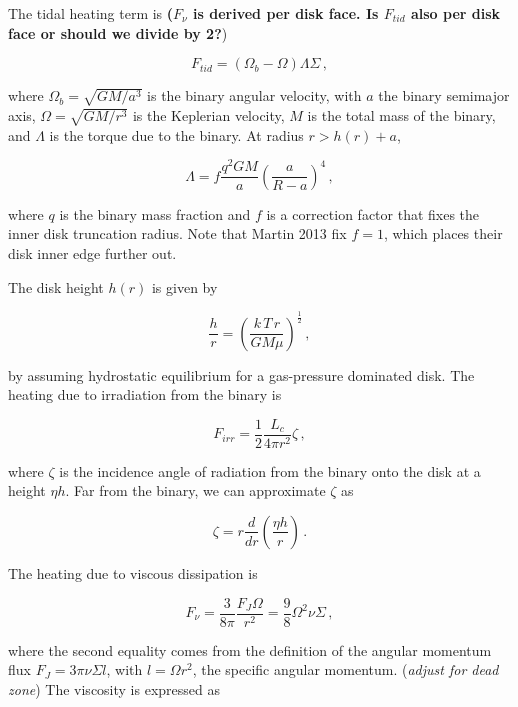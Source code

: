 \documentclass{article}
\begin{document}
The tidal heating term is \textbf{($F_{\nu}$ is derived per disk face. Is $F_{tid}$ also per disk face or should we divide by 2?})

\begin{equation}
F_{tid} = \left(\Omega_b - \Omega\right) \Lambda \Sigma\,,
\end{equation}

where $\Omega_b = \sqrt{G M/a^3}$ is the binary angular velocity, with $a$ the binary semimajor axis, $\Omega = \sqrt{G M/r^{3}}$ is the Keplerian velocity, $M$ is the total mass of the binary, and $\Lambda$ is the torque due to the binary. At radius $r > h(r) + a$,

\begin{equation}
\Lambda = f \frac{q^2 GM}{a} \left(\frac{a}{R-a}\right)^4\,,
\end{equation}

where $q$ is the binary mass fraction and $f$ is a correction factor that fixes the inner disk truncation radius. Note that Martin 2013 fix $f =1$, which places their disk inner edge further out. 

The disk height $h(r)$ is given by

\begin{equation}
\frac{h}{r} = \left(\frac{k\,T\,r}{G M\mu}\right)^\frac{1}{2} \,,
\end{equation}

by assuming hydrostatic equilibrium for a gas-pressure dominated disk.
The heating due to irradiation from the binary is

\begin{equation}
F_{irr} = \frac{1}{2} \frac{L_c}{4\pi r^2} \zeta\,,
\end{equation}

where $\zeta$ is the incidence angle of radiation from the binary onto the disk at a height $\eta h$. Far from the binary, we can approximate $\zeta$ as

\begin{equation}
\zeta = r \frac{d}{dr} \left(\frac{\eta h}{r}\right)\,.
\end{equation}

The heating due to viscous dissipation is

\begin{equation}
F_\nu = \frac{3}{8\pi} \frac{F_J \Omega}{r^2} = \frac{9}{8} \Omega^2 \nu \Sigma\,,
\end{equation}

where the second equality comes from the definition of the angular momentum flux $F_J = 3 \pi \nu \Sigma l$, with $l = \Omega r^2$, the specific angular momentum. (\textit{adjust for dead zone}) The viscosity is expressed as
\end{document}
